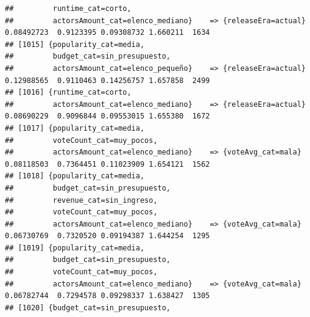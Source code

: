 \documentclass[
]{article}
\begin{document}
\begin{verbatim}
##         runtime_cat=corto,                                                                                                      
##         actorsAmount_cat=elenco_mediano}    => {releaseEra=actual}               0.08492723  0.9123395 0.09308732 1.660211  1634
## [1015] {popularity_cat=media,                                                                                                   
##         budget_cat=sin_presupuesto,                                                                                             
##         actorsAmount_cat=elenco_pequeño}    => {releaseEra=actual}               0.12988565  0.9110463 0.14256757 1.657858  2499
## [1016] {runtime_cat=corto,                                                                                                      
##         actorsAmount_cat=elenco_mediano}    => {releaseEra=actual}               0.08690229  0.9096844 0.09553015 1.655380  1672
## [1017] {popularity_cat=media,                                                                                                   
##         voteCount_cat=muy_pocos,                                                                                                
##         actorsAmount_cat=elenco_mediano}    => {voteAvg_cat=mala}                0.08118503  0.7364451 0.11023909 1.654121  1562
## [1018] {popularity_cat=media,                                                                                                   
##         budget_cat=sin_presupuesto,                                                                                             
##         revenue_cat=sin_ingreso,                                                                                                
##         voteCount_cat=muy_pocos,                                                                                                
##         actorsAmount_cat=elenco_mediano}    => {voteAvg_cat=mala}                0.06730769  0.7320520 0.09194387 1.644254  1295
## [1019] {popularity_cat=media,                                                                                                   
##         budget_cat=sin_presupuesto,                                                                                             
##         voteCount_cat=muy_pocos,                                                                                                
##         actorsAmount_cat=elenco_mediano}    => {voteAvg_cat=mala}                0.06782744  0.7294578 0.09298337 1.638427  1305
## [1020] {budget_cat=sin_presupuesto,                                                                                             

\end{verbatim}
\end{document}
